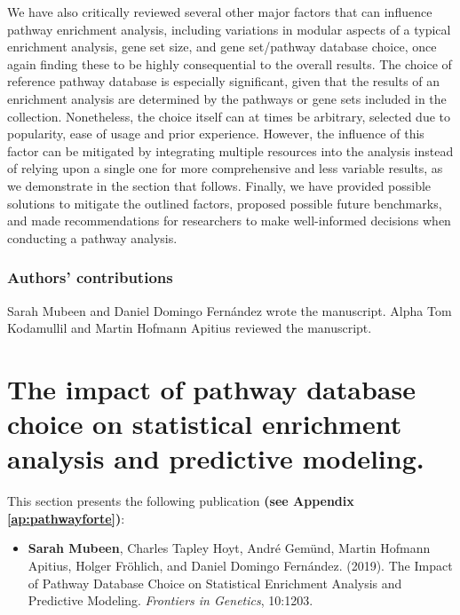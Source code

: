 We have also critically reviewed several other major factors that can influence pathway enrichment analysis, including variations in modular aspects of a typical enrichment analysis, gene set size, and gene set/pathway database choice, once again finding these to be highly consequential to the overall results. The choice of reference pathway database is especially significant, given that the results of an enrichment analysis are determined by the pathways or gene sets included in the collection. Nonetheless, the choice itself can at times be arbitrary, selected due to popularity, ease of usage and prior experience. However, the influence of this factor can be mitigated by integrating multiple resources into the analysis instead of relying upon a single one for more comprehensive and less variable results, as we demonstrate in the section that follows. Finally, we have provided possible solutions to mitigate the outlined factors, proposed possible future benchmarks, and made recommendations for researchers to make well-informed decisions when conducting a pathway analysis. 

\subsubsection{Authors' contributions}

Sarah Mubeen and Daniel Domingo Fernández wrote the manuscript. Alpha Tom Kodamullil and Martin Hofmann Apitius reviewed the manuscript.

\newpage


\section{The impact of pathway database choice on statistical enrichment analysis and predictive modeling.}

\label{ch:pathwayforte}

This section presents the following publication \textbf{(see Appendix \ref{ap:pathwayforte})}:

\begin{itemize}

\item[] \textbf{Sarah Mubeen}, Charles Tapley Hoyt, André Gemünd, Martin Hofmann Apitius, Holger Fröhlich, and Daniel Domingo Fernández. (2019). The Impact of Pathway Database Choice on Statistical Enrichment Analysis and Predictive Modeling. \textit{Frontiers in Genetics}, 10:1203.

\end{itemize}

